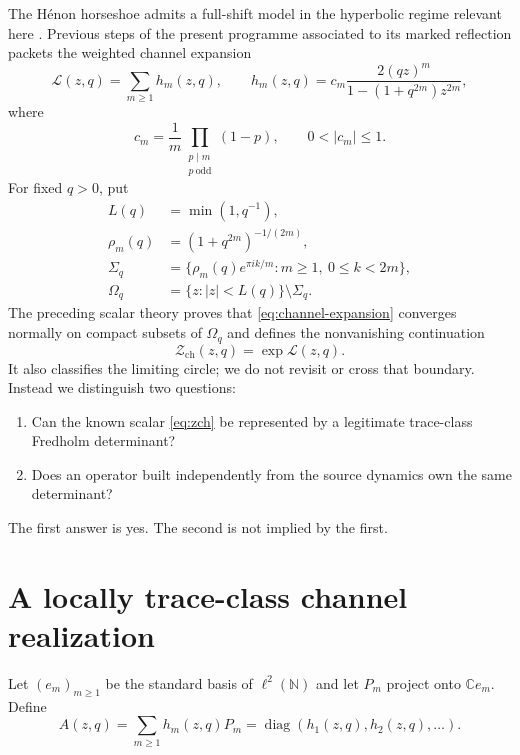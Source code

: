 \documentclass[11pt]{article}
\newcommand{\Zch}{\mathcal Z_{\mathrm{ch}}}
\begin{document}
The H\'enon horseshoe admits a full-shift model in the hyperbolic regime
relevant here \cite{DevaneyNitecki1979,Arai2007}.  Previous steps of the
present programme associated to its marked reflection packets the weighted
channel expansion
\begin{equation}\label{eq:channel-expansion}
 \mathcal L(z,q)=\sum_{m\geq1}h_m(z,q),\qquad
 h_m(z,q)=c_m\frac{2(qz)^m}
 {1-(1+q^{2m})z^{2m}},
\end{equation}
where
\begin{equation}\label{eq:coefficient}
 c_m=\frac1m\prod_{\substack{p\mid m\\p\ \mathrm{odd}}}(1-p),
 \qquad 0<|c_m|\leq1.
\end{equation}
For fixed $q>0$, put
\begin{align}
 L(q)&=\min(1,q^{-1}),\\
 \rho_m(q)&=(1+q^{2m})^{-1/(2m)},\\
 \Sigma_q&=\{\rho_m(q)e^{\pi i k/m}:m\geq1,\ 0\leq k<2m\},\\
 \Omega_q&=\{z:|z|<L(q)\}\setminus\Sigma_q.
\end{align}
The preceding scalar theory proves that \eqref{eq:channel-expansion}
converges normally on compact subsets of $\Omega_q$ and defines the
nonvanishing continuation
\begin{equation}\label{eq:zch}
 \Zch(z,q)=\exp \mathcal L(z,q).
\end{equation}
It also classifies the limiting circle; we do not revisit or cross that
boundary.  Instead we distinguish two questions:

\begin{enumerate}
 \item Can the known scalar \eqref{eq:zch} be represented by a legitimate
 trace-class Fredholm determinant?
 \item Does an operator built independently from the source dynamics own
 the same determinant?
\end{enumerate}

The first answer is yes.  The second is not implied by the first.

\section{A locally trace-class channel realization}

Let $(e_m)_{m\geq1}$ be the standard basis of $\ell^2(\mathbb N)$ and let
$P_m$ project onto $\mathbb C e_m$.  Define
\begin{equation}\label{eq:A}
 A(z,q)=\sum_{m\geq1}h_m(z,q)P_m
       =\operatorname{diag}(h_1(z,q),h_2(z,q),\ldots).
\end{equation}
\end{document}

